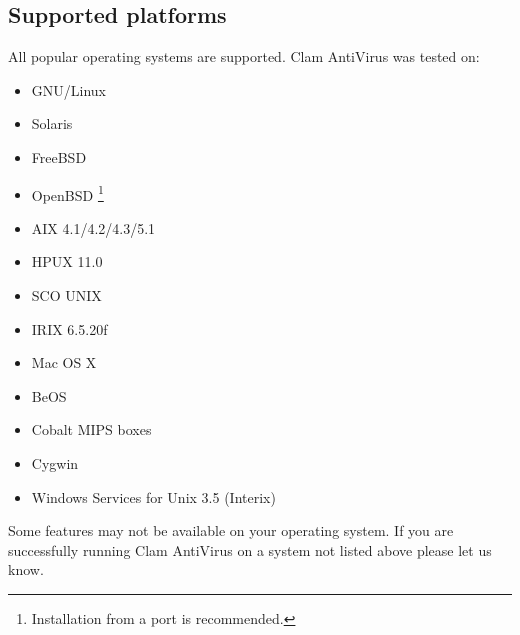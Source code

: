 \documentclass[a4paper,titlepage,12pt]{article}
\begin{document}
    \subsection{Supported platforms}
    All popular operating systems are supported. Clam AntiVirus was tested
    on:
    \begin{itemize}
	\item{GNU/Linux}
	\item{Solaris}
	\item{FreeBSD}
	\item{OpenBSD} \footnote{Installation from a port is recommended.}
	\item{AIX 4.1/4.2/4.3/5.1}
	\item{HPUX 11.0}
	\item{SCO UNIX}
	\item{IRIX 6.5.20f}
	\item{Mac OS X}
	\item{BeOS}
	\item{Cobalt MIPS boxes}
	\item{Cygwin}
	\item{Windows Services for Unix 3.5 (Interix)}
    \end{itemize}
    Some features may not be available on your operating system. If you
    are successfully running Clam AntiVirus on a system not listed above
    please let us know.
\end{document}
